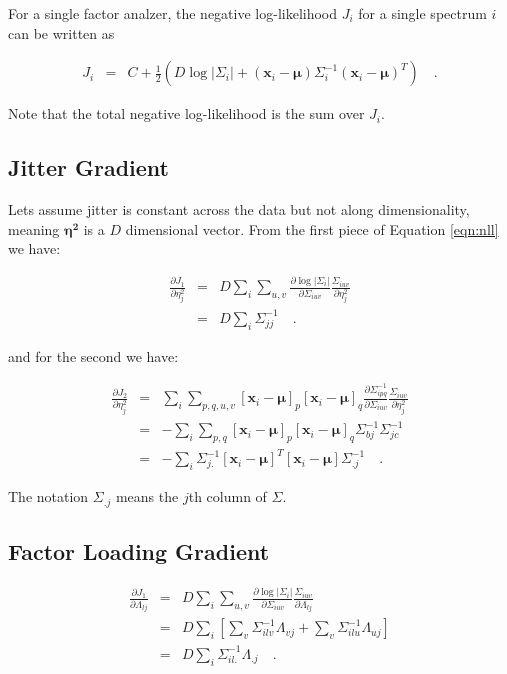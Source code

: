 \documentclass[letterpaper,12pt]{article}
\newcommand{\vect}[1]{\boldsymbol{#1}}
\newcommand{\data}{\vect{x}}
\newcommand{\mean}{\vect{\mu}}
\newcommand{\et}{\vect{\eta^2}}
\begin{document}
For a single factor analzer, the negative log-likelihood $J_i$ for a single spectrum $i$ can be
written as

\begin{eqnarray}\displaystyle
J_{i} &=& C + \frac{1}{2}\left(D\log|\Sigma_i| + (\data_i-\mean)\Sigma_i^{-1}(\data_i-\mean)^T\right)
\quad .
\label{eqn:nll}
\end{eqnarray}

Note that the total negative log-likelihood is the sum over $J_i$.

\subsection{Jitter Gradient}

Lets assume jitter is constant across the data but not along
dimensionality, meaning $\et$ is a $D$ dimensional vector.  From the
first piece of Equation \ref{eqn:nll} we have:

\begin{eqnarray}\displaystyle
\frac{\partial J_1}{\partial \eta_j^2} &=& D\sum_i \sum_{u,v}
\frac{\partial \log|\Sigma_i|}{\partial
  \Sigma_{iuv}}\frac{\Sigma_{iuv}}{\partial \eta_j^2} \\
&=& D \sum_i \Sigma_{jj}^{-1}
\quad .
\label{eqn:gradjit1}
\end{eqnarray}

and for the second we have:

\begin{eqnarray}\displaystyle
\frac{\partial J_2}{\partial \eta_j^2} &=& \sum_i \sum_{p,q,u,v}
[\data_i-\mean]_p [\data_i-\mean]_q\frac{\partial \Sigma^{-1}_{ipq}}{\partial
  \Sigma_{iuv}}\frac{\Sigma_{iuv}}{\partial \eta_j^2} \\
&=& -\sum_i \sum_{p,q}[\data_i-\mean]_p [\data_i-\mean]_q\Sigma_{bj}^{-1}\Sigma_{jc}^{-1}\\
&=& -\sum_i \Sigma_{j.}^{-1}[\data_i-\mean]^T [\data_i-\mean]\Sigma_{.j}^{-1}
\quad .
\label{eqn:gradjit2}
\end{eqnarray}

The notation $\Sigma_{.j}$ means the $j$th column of $\Sigma$.

\subsection{Factor Loading Gradient}

\begin{eqnarray}\displaystyle
\frac{\partial J_1}{\partial \Lambda_{lj}} &=& D\sum_i \sum_{u,v}
\frac{\partial \log|\Sigma_i|}{\partial
  \Sigma_{iuv}}\frac{\Sigma_{iuv}}{\partial \Lambda_{lj}} \\
&=& D \sum_i \left[\sum_v\Sigma^{-1}_{ilv}\Lambda_{vj} + \sum_v\Sigma^{-1}_{ilu}\Lambda_{uj}\right]\\
&=& D \sum_i \Sigma^{-1}_{il.}\Lambda_{.j}
\quad .
\label{eqn:lambda1}
\end{eqnarray}
\end{document}
